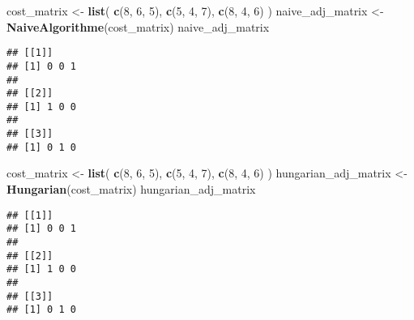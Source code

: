 \documentclass[
  ignorenonframetext,
]{beamer}
\newenvironment{Shaded}{\begin{snugshade}}{\end{snugshade}}
\newcommand{\DecValTok}[1]{\textcolor[rgb]{0.00,0.00,0.81}{#1}}
\newcommand{\FunctionTok}[1]{\textcolor[rgb]{0.13,0.29,0.53}{\textbf{#1}}}
\newcommand{\NormalTok}[1]{#1}
\newcommand{\OtherTok}[1]{\textcolor[rgb]{0.56,0.35,0.01}{#1}}
\begin{document}
\begin{frame}[fragile]{}
\protect\hypertarget{section-17}{}
\begin{Shaded}
\begin{Highlighting}[]
\NormalTok{cost\_matrix }\OtherTok{\textless{}{-}} \FunctionTok{list}\NormalTok{(}
  \FunctionTok{c}\NormalTok{(}\DecValTok{8}\NormalTok{, }\DecValTok{6}\NormalTok{, }\DecValTok{5}\NormalTok{),}
  \FunctionTok{c}\NormalTok{(}\DecValTok{5}\NormalTok{, }\DecValTok{4}\NormalTok{, }\DecValTok{7}\NormalTok{),}
  \FunctionTok{c}\NormalTok{(}\DecValTok{8}\NormalTok{, }\DecValTok{4}\NormalTok{, }\DecValTok{6}\NormalTok{)}
\NormalTok{)}
\NormalTok{naive\_adj\_matrix }\OtherTok{\textless{}{-}} \FunctionTok{NaiveAlgorithme}\NormalTok{(cost\_matrix)}
\NormalTok{naive\_adj\_matrix}
\end{Highlighting}
\end{Shaded}

\begin{verbatim}
## [[1]]
## [1] 0 0 1
## 
## [[2]]
## [1] 1 0 0
## 
## [[3]]
## [1] 0 1 0
\end{verbatim}

\begin{Shaded}
\begin{Highlighting}[]
\NormalTok{cost\_matrix }\OtherTok{\textless{}{-}} \FunctionTok{list}\NormalTok{(}
  \FunctionTok{c}\NormalTok{(}\DecValTok{8}\NormalTok{, }\DecValTok{6}\NormalTok{, }\DecValTok{5}\NormalTok{),}
  \FunctionTok{c}\NormalTok{(}\DecValTok{5}\NormalTok{, }\DecValTok{4}\NormalTok{, }\DecValTok{7}\NormalTok{),}
  \FunctionTok{c}\NormalTok{(}\DecValTok{8}\NormalTok{, }\DecValTok{4}\NormalTok{, }\DecValTok{6}\NormalTok{)}
\NormalTok{)}
\NormalTok{hungarian\_adj\_matrix }\OtherTok{\textless{}{-}} \FunctionTok{Hungarian}\NormalTok{(cost\_matrix)}
\NormalTok{hungarian\_adj\_matrix}
\end{Highlighting}
\end{Shaded}

\begin{verbatim}
## [[1]]
## [1] 0 0 1
## 
## [[2]]
## [1] 1 0 0
## 
## [[3]]
## [1] 0 1 0
\end{verbatim}
\end{frame}
\end{document}
